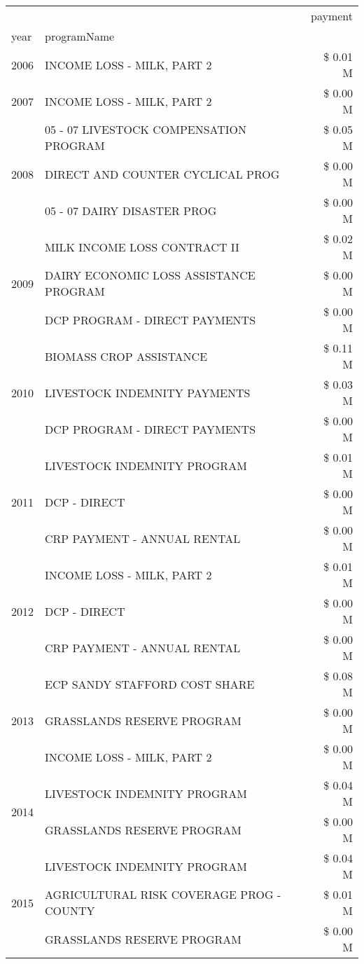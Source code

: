 \begin{tabular}{llr}
\toprule
 &  & payment \\
year & programName &  \\
\midrule
2006 & INCOME LOSS - MILK, PART 2 & \$ 0.01 M \\
\cline{1-3}
2007 & INCOME LOSS - MILK, PART 2 & \$ 0.00 M \\
\cline{1-3}
\multirow[t]{3}{*}{2008} & 05 - 07 LIVESTOCK COMPENSATION PROGRAM & \$ 0.05 M \\
 & DIRECT AND COUNTER CYCLICAL PROG & \$ 0.00 M \\
 & 05 - 07 DAIRY DISASTER PROG & \$ 0.00 M \\
\cline{1-3}
\multirow[t]{3}{*}{2009} & MILK INCOME LOSS CONTRACT II & \$ 0.02 M \\
 & DAIRY ECONOMIC LOSS ASSISTANCE PROGRAM & \$ 0.00 M \\
 & DCP PROGRAM - DIRECT PAYMENTS & \$ 0.00 M \\
\cline{1-3}
\multirow[t]{3}{*}{2010} & BIOMASS CROP ASSISTANCE & \$ 0.11 M \\
 & LIVESTOCK INDEMNITY PAYMENTS & \$ 0.03 M \\
 & DCP PROGRAM - DIRECT PAYMENTS & \$ 0.00 M \\
\cline{1-3}
\multirow[t]{3}{*}{2011} & LIVESTOCK INDEMNITY PROGRAM & \$ 0.01 M \\
 & DCP - DIRECT & \$ 0.00 M \\
 & CRP PAYMENT - ANNUAL RENTAL & \$ 0.00 M \\
\cline{1-3}
\multirow[t]{3}{*}{2012} & INCOME LOSS - MILK, PART 2 & \$ 0.01 M \\
 & DCP - DIRECT & \$ 0.00 M \\
 & CRP PAYMENT - ANNUAL RENTAL & \$ 0.00 M \\
\cline{1-3}
\multirow[t]{3}{*}{2013} & ECP SANDY STAFFORD COST SHARE & \$ 0.08 M \\
 & GRASSLANDS RESERVE PROGRAM & \$ 0.00 M \\
 & INCOME LOSS - MILK, PART 2 & \$ 0.00 M \\
\cline{1-3}
\multirow[t]{2}{*}{2014} & LIVESTOCK INDEMNITY PROGRAM & \$ 0.04 M \\
 & GRASSLANDS RESERVE PROGRAM & \$ 0.00 M \\
\cline{1-3}
\multirow[t]{3}{*}{2015} & LIVESTOCK INDEMNITY PROGRAM & \$ 0.04 M \\
 & AGRICULTURAL RISK COVERAGE PROG - COUNTY & \$ 0.01 M \\
 & GRASSLANDS RESERVE PROGRAM & \$ 0.00 M \\

\end{tabular}
